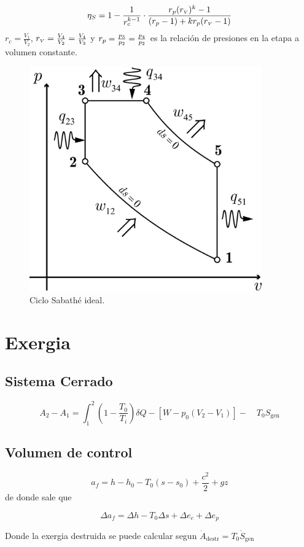 \documentclass{article}
\newcommand{\ctegas}{k}
\newcommand{\Sgen}{S_{\textrm{gen}}}
\newcommand{\dSgen}{\dot{S}_{\textrm{gen}}}
\newcommand{\dAdestr}{\dot{A}_{\mathrm{destr}}}
\newcommand{\rc}{r_c}
\newcommand{\rp}{r_{\mbox{\scriptsize$p$}}}
\newcommand{\rv}{r_{\mbox{\tiny$V$}}}
\begin{document}
\begin{equation}
\eta_S=1-\frac{1}{\rc^{\ctegas -1}}\cdot \frac{\rp(\rv)^\ctegas-1}{(\rp -1)+\ctegas\rp(\rv-1)}
\end{equation}
$\rc=\frac{V_1}{V_2}$, $\rv=\frac{V_4}{V_2}=\frac{V_4}{V_3}$ y $\rp=\frac{p_3}{p_2}=\frac{p_4}{p_2}$ es la relación de presiones en la etapa a volumen constante.
\begin{figure}[htb!]
    \centering
    \includegraphics[width=10cm]{fig/ciclodual.eps}
    \caption{Ciclo Sabathé ideal.}
    \label{fig:dualideal}
\end{figure}

\section{Exergia}
\subsection{Sistema Cerrado}

\begin{equation}
	A_2 - A_{1}=\int_{1}^{2}\left(1-\frac{T_{0}}{T_{i}}\right) \delta Q-\left[W-p_{0}\left(V_{2}-V_{1}\right)\right]-\quad T_{0} \Sgen
\end{equation}

\subsection{Volumen de control}

\[
a_f = h-h_{0}-T_{0}\left(s-s_{0}\right)+\frac{c^{2}}{2}+g z
\]
de donde sale que 

\begin{equation}
	\Delta a_f = \Delta h - T_0 \Delta s + \Delta e_c + \Delta e_p
\end{equation}

Donde la exergia destruida se puede calcular segun $\dAdestr = T_0 \dSgen $
\end{document}
